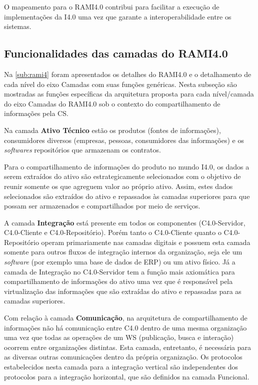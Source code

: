 O mapeamento para o RAMI4.0 contribui para facilitar a execução de implementações da I4.0 uma vez que garante a interoperabilidade entre os sistemas.

\subsection{Funcionalidades das camadas do RAMI4.0}

Na \autoref{sub:rami4} foram apresentados os detalhes do RAMI4.0 e o detalhamento de cada nível do eixo Camadas com suas funções genéricas. Nesta subseção são mostradas as funções específicas da arquitetura proposta para cada nível/camada do eixo Camadas do RAMI4.0 sob o contexto do compartilhamento de informações pela CS.

Na camada \textbf{Ativo Técnico} estão os produtos (fontes de informações), consumidores diversos (empresas, pessoas, consumidores das informações) e os \textit{softwares} repositórios que armazenam os contratos.

Para o compartilhamento de informações do produto no mundo I4.0, os dados a serem extraídos do ativo são estrategicamente selecionados com o objetivo de reunir somente os que agreguem valor ao próprio ativo. Assim, estes dados selecionados são extraídos do ativo e repassados às camadas superiores para que possam ser armazenados e compartilhados por meio de serviços.

A camada \textbf{Integração} está presente em todos os componentes (C4.0-Servidor, C4.0-Cliente e C4.0-Repositório). Porém tanto o C4.0-Cliente quanto o C4.0-Repositório operam primariamente nas camadas digitais e possuem esta camada somente para outros fluxos de integração internos da organização, seja ele um \textit{software} (por exemplo uma base de dados de ERP) ou um ativo físico. Já a camada de Integração no C4.0-Servidor tem a função mais axiomática para compartilhamento de informações do ativo uma vez que é responsável pela virtualização das informações que são extraídas do ativo e repassadas para as camadas superiores.

Com relação à camada \textbf{Comunicação}, na arquitetura de compartilhamento de informações não há comunicação entre C4.0 dentro de uma mesma organização uma vez que todas as operações de um WS (publicação, busca e interação) ocorrem entre organizações distintas. Esta camada, entretanto, é necessária para as diversas outras comunicações dentro da própria organização. Os protocolos estabelecidos nesta camada para a integração vertical são independentes dos protocolos para a integração horizontal, que são definidos na camada Funcional.

